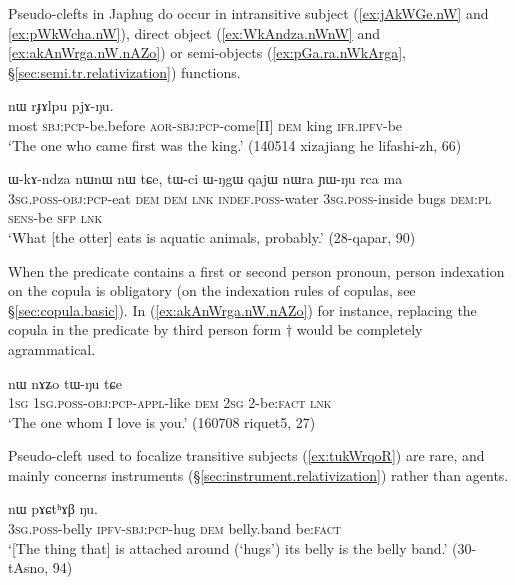 Pseudo-clefts in Japhug do occur in intransitive subject (\ref{ex:jAkWGe.nW} and  \ref{ex:pWkWcha.nW}), direct object (\ref{ex:WkAndza.nWnW} and \ref{ex:akAnWrga.nW.nAZo}) or semi-objects (\ref{ex:pGa.ra.nWkArga}, §\ref{sec:semi.tr.relativization}) functions.

\begin{exe}
\ex \label{ex:jAkWGe.nW}
 nɯ rɟɤlpu pjɤ-ŋu.\\
most \textsc{sbj}:\textsc{pcp}-be.before \textsc{aor}-\textsc{sbj}:\textsc{pcp}-come[II] \textsc{dem} king \textsc{ifr}.\textsc{ipfv}-be\\
\glt `The one who came first was the king.' (140514 xizajiang he lifashi-zh, 66)
\end{exe}

\begin{exe}
\ex \label{ex:WkAndza.nWnW}
\gll ɯ-kɤ-ndza nɯnɯ nɯ tɕe, tɯ-ci ɯ-ŋgɯ qajɯ nɯra ɲɯ-ŋu rca ma \\
\textsc{3sg}.\textsc{poss}-\textsc{obj}:\textsc{pcp}-eat \textsc{dem} \textsc{dem} \textsc{lnk} \textsc{indef}.\textsc{poss}-water \textsc{3sg}.\textsc{poss}-inside bugs \textsc{dem}:\textsc{pl} \textsc{sens}-be \textsc{sfp} \textsc{lnk} \\
\glt `What [the otter] eats is aquatic animals, probably.' (28-qapar, 90)
\end{exe}

When the predicate contains a first or second person pronoun, person indexation on the copula is obligatory (on the indexation rules of copulas, see §\ref{sec:copula.basic}). In  (\ref{ex:akAnWrga.nW.nAZo}) for instance, replacing the copula in the predicate  by third person form $\dagger$ would be completely agrammatical.
 
\begin{exe}
\ex \label{ex:akAnWrga.nW.nAZo}
 nɯ nɤʑo tɯ-ŋu tɕe \\
\textsc{1sg} \textsc{1sg}.\textsc{poss}-\textsc{obj}:\textsc{pcp}-\textsc{appl}-like \textsc{dem} \textsc{2sg} 2-be:\textsc{fact} \textsc{lnk} \\
\glt `The one whom I love is you.' (160708 riquet5, 27)
\end{exe}

Pseudo-cleft used to focalize transitive subjects (\ref{ex:tukWrqoR}) are rare, and mainly concerns instruments (§\ref{sec:instrument.relativization}) rather than agents.

\begin{exe}
\ex \label{ex:tukWrqoR}
 nɯ pɤɕtʰɤβ ŋu. \\
\textsc{3sg}.\textsc{poss}-belly \textsc{ipfv}-\textsc{sbj}:\textsc{pcp}-hug \textsc{dem} belly.band be:\textsc{fact} \\
\glt `[The thing that] is attached around (`hugs') its belly is the belly band.' (30-tAsno, 94)
 \end{exe}
 
